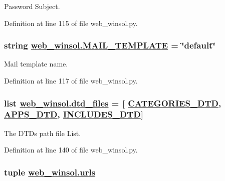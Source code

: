 Password Subject. 



Definition at line 115 of file web\_\-winsol.py.\hypertarget{namespaceweb__winsol_ab7bb89c8e14b61fccd8389c4ce6306e}{
\subsubsection[MAIL\_\-TEMPLATE]{\setlength{\rightskip}{0pt plus 5cm}string \hyperlink{namespaceweb__winsol_ab7bb89c8e14b61fccd8389c4ce6306e}{web\_\-winsol.MAIL\_\-TEMPLATE} = \char`\"{}default\char`\"{}}}
\label{namespaceweb__winsol_ab7bb89c8e14b61fccd8389c4ce6306e}


Mail template name. 



Definition at line 117 of file web\_\-winsol.py.\hypertarget{namespaceweb__winsol_85f622b96ce208dd36284f86e6a74183}{
\subsubsection[dtd\_\-files]{\setlength{\rightskip}{0pt plus 5cm}list \hyperlink{namespaceweb__winsol_85f622b96ce208dd36284f86e6a74183}{web\_\-winsol.dtd\_\-files} = \mbox{[} \hyperlink{namespaceweb__winsol_2eb695d5ff57aa0a09995d8622b60efd}{CATEGORIES\_\-DTD}, \hyperlink{namespaceweb__winsol_83be49c783105f474efdcf2e83370b85}{APPS\_\-DTD}, \hyperlink{namespaceweb__winsol_85237de6fb02ee9c3fdd831318d9c73f}{INCLUDES\_\-DTD}\mbox{]}}}
\label{namespaceweb__winsol_85f622b96ce208dd36284f86e6a74183}


The DTDs path file List. 



Definition at line 140 of file web\_\-winsol.py.\hypertarget{namespaceweb__winsol_225bff55507b6e7c91a86ea03ba9b942}{
\subsubsection[urls]{\setlength{\rightskip}{0pt plus 5cm}tuple \hyperlink{namespaceweb__winsol_225bff55507b6e7c91a86ea03ba9b942}{web\_\-winsol.urls}}}
\label{namespaceweb__winsol_225bff55507b6e7c91a86ea03ba9b942}


